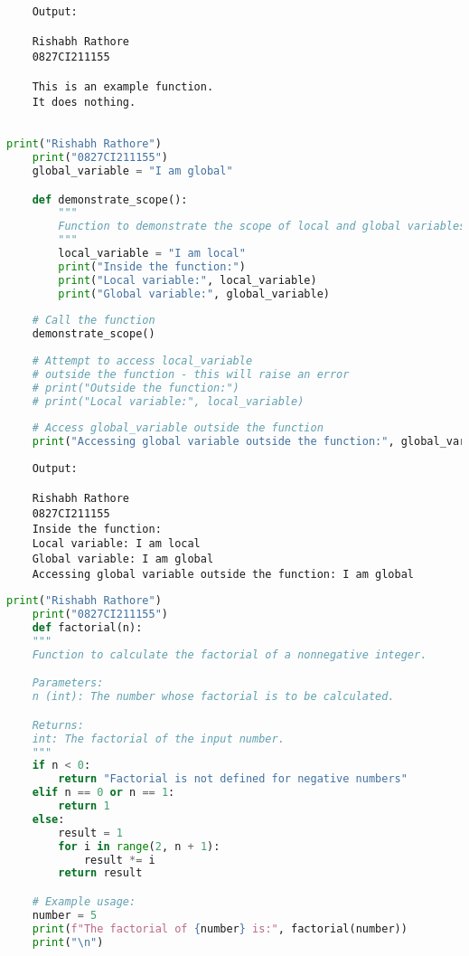 \documentclass{report}
\begin{document}
\begin{verbatim}
	Output:

	Rishabh Rathore
	0827CI211155

    This is an example function.
    It does nothing.


\end{verbatim}


\bigskip


\sol 
\begin{lstlisting}[language=Python]
	print("Rishabh Rathore")
	print("0827CI211155")
	global_variable = "I am global"

	def demonstrate_scope():
		"""
		Function to demonstrate the scope of local and global variables.
		"""
		local_variable = "I am local"
		print("Inside the function:")
		print("Local variable:", local_variable)
		print("Global variable:", global_variable)
	
	# Call the function
	demonstrate_scope()
	
	# Attempt to access local_variable 
	# outside the function - this will raise an error
	# print("Outside the function:")
	# print("Local variable:", local_variable)
	
	# Access global_variable outside the function
	print("Accessing global variable outside the function:", global_variable)


\end{lstlisting}

\begin{verbatim}
	Output:

	Rishabh Rathore
	0827CI211155
	Inside the function:
	Local variable: I am local
	Global variable: I am global
	Accessing global variable outside the function: I am global

\end{verbatim}


\bigskip


\sol 
\begin{lstlisting}[language=Python]
	print("Rishabh Rathore")
	print("0827CI211155")
	def factorial(n):
    """
    Function to calculate the factorial of a nonnegative integer.

    Parameters:
    n (int): The number whose factorial is to be calculated.

    Returns:
    int: The factorial of the input number.
    """
    if n < 0:
        return "Factorial is not defined for negative numbers"
    elif n == 0 or n == 1:
        return 1
    else:
        result = 1
        for i in range(2, n + 1):
            result *= i
        return result

	# Example usage:
	number = 5
	print(f"The factorial of {number} is:", factorial(number))
	print("\n")
  

\end{lstlisting}
\end{document}
